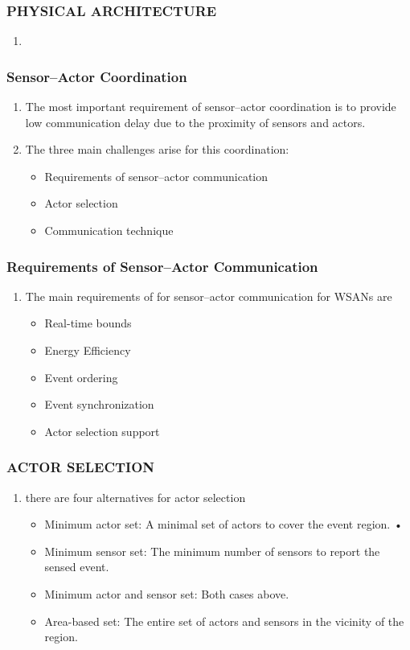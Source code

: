 \documentclass[11pt]{class}
\begin{document}
							\begin{frame}
								\frametitle{PHYSICAL ARCHITECTURE}
								\begin{enumerate}
									\item 
								\end{enumerate}
								\end{frame}
									\begin{frame}
										\frametitle{Sensor–Actor Coordination}
										\begin{enumerate}
											\item The most important requirement of sensor–actor coordination is to provide low communication delay due to the proximity of sensors and actors.
											\item The three main
											challenges arise for this coordination:
											\begin{itemize}
												\item Requirements of sensor–actor communication
												\item Actor selection
												\item Communication technique
											\end{itemize}
										\end{enumerate}
									\end{frame}
									\begin{frame}
										\frametitle{Requirements of Sensor–Actor Communication}
										\begin{enumerate}
											\item The main requirements of for sensor–actor communication for WSANs are 
											\begin{itemize}
												\item Real-time bounds
												\item Energy Efficiency
												\item Event ordering
												\item Event synchronization
												\item Actor selection support
											\end{itemize}
										\end{enumerate}
									\end{frame}
									\begin{frame}
										\frametitle{ACTOR SELECTION}
										\begin{enumerate}
											\item there are four alternatives for actor selection
											\begin{itemize}
												\item Minimum actor set: A minimal set of actors to cover the event region.												• \item Minimum sensor set: The minimum number of sensors to report the sensed event.
												\item Minimum actor and sensor set: Both cases above.
												\item Area-based set: The entire set of actors and sensors in the vicinity of the region.
										\end{itemize}
										\end{enumerate}
									\end{frame}
\end{document}
